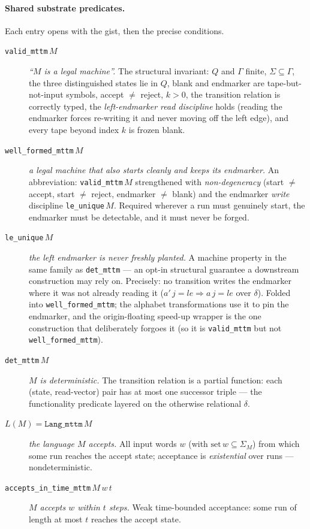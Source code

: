 \paragraph{Shared substrate predicates.}
Each entry opens with the gist, then the precise conditions.
\begin{description}
\item[\texttt{valid\_mttm}\,$M$] \emph{``$M$ is a legal machine''.}  The
  structural invariant: $Q$ and $\Gamma$ finite,
  $\Sigma \subseteq \Gamma$, the three distinguished states lie in $Q$,
  blank and endmarker are tape-but-not-input symbols,
  accept $\neq$ reject, $k > 0$, the transition relation is correctly
  typed, the \emph{left-endmarker read discipline} holds (reading the
  endmarker forces re-writing it and never moving off the left edge),
  and every tape beyond index $k$ is frozen blank.
\item[\texttt{well\_formed\_mttm}\,$M$] \emph{a legal machine that also
  starts cleanly and keeps its endmarker.}  An abbreviation:
  \texttt{valid\_mttm}\,$M$ strengthened with \emph{non-degeneracy}
  (start $\neq$ accept, start $\neq$ reject, endmarker $\neq$ blank) and
  the endmarker \emph{write} discipline \texttt{le\_unique}\,$M$.
  Required wherever a run must genuinely start, the endmarker must be
  detectable, and it must never be forged.
\item[\texttt{le\_unique}\,$M$] \emph{the left endmarker is never
  freshly planted.}  A machine property in the same family as
  \texttt{det\_mttm} --- an opt-in structural guarantee a downstream
  construction may rely on.  Precisely: no transition writes the
  endmarker where it was not already reading it
  ($a'\,j = le \Rightarrow a\,j = le$ over $\delta$).  Folded into
  \texttt{well\_formed\_mttm}; the alphabet transformations use it to
  pin the endmarker, and the origin-floating speed-up wrapper is the
  one construction that deliberately forgoes it (so it is
  \texttt{valid\_mttm} but not \texttt{well\_formed\_mttm}).
\item[\texttt{det\_mttm}\,$M$] \emph{$M$ is deterministic.}  The
  transition relation is a partial function: each (state, read-vector)
  pair has at most one successor triple --- the functionality predicate
  layered on the otherwise relational $\delta$.
\item[$L(M) = \texttt{Lang\_mttm}\,M$] \emph{the language $M$ accepts.}
  All input words $w$ (with $\mathrm{set}\,w \subseteq \Sigma_M$) from
  which some run reaches the accept state; acceptance is
  \emph{existential} over runs --- nondeterministic.
\item[\texttt{accepts\_in\_time\_mttm}\,$M\,w\,t$] \emph{$M$ accepts
  $w$ within $t$ steps.}  Weak time-bounded acceptance: some run of
  length at most $t$ reaches the accept state.
\end{description}

